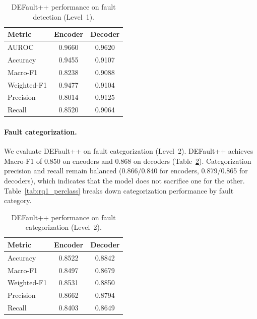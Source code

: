 \begin{table}[!htbp]
\centering
\caption{DEFault++ performance on fault detection (Level~1).}
\label{tab:perf_level1}
\begin{tabular}{l c c}
\toprule
\textbf{Metric} & \textbf{Encoder} & \textbf{Decoder} \\
\midrule
AUROC & 0.9660 & 0.9620 \\
Accuracy & 0.9455 & 0.9107 \\
Macro-F1 & 0.8238 & 0.9088 \\
Weighted-F1 & 0.9477 & 0.9104 \\
Precision & 0.8014 & 0.9125 \\
Recall & 0.8520 & 0.9064 \\
\bottomrule
\end{tabular}
\end{table}

\paragraph{Fault categorization.}
We evaluate DEFault++ on fault categorization (Level~2). DEFault++ achieves Macro-F1 of 0.850 on encoders and 0.868 on decoders (Table~\ref{tab:perf_level2_overall}). Categorization precision and recall remain balanced (0.866/0.840 for encoders, 0.879/0.865 for decoders), which indicates that the model does not sacrifice one for the other. Table~\ref{tab:rq1_perclass} breaks down categorization performance by fault category.

\begin{table}[!htbp]
\centering
\caption{DEFault++ performance on fault categorization (Level~2).}
\label{tab:perf_level2_overall}
\begin{tabular}{l c c}
\toprule
\textbf{Metric} & \textbf{Encoder} & \textbf{Decoder} \\
\midrule
Accuracy & 0.8522 & 0.8842 \\
Macro-F1 & 0.8497 & 0.8679 \\
Weighted-F1 & 0.8531 & 0.8850 \\
Precision & 0.8662 & 0.8794 \\
Recall & 0.8403 & 0.8649 \\
\bottomrule
\end{tabular}
\end{table}

